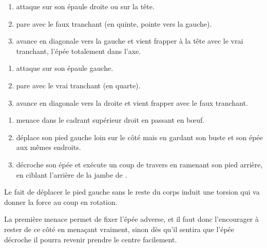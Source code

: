 \begin{technique}

\begin{enumerate}
	\item \A attaque \D sur son épaule droite ou sur la tête.
	
	\item \D pare avec le faux tranchant (en quinte, pointe vers la gauche).
	
	\item \D avance en diagonale vers la gauche et vient frapper \A à la tête avec le vrai tranchant, l'épée totalement dans l'axe.
\end{enumerate}

\end{technique}


\begin{technique}

\begin{enumerate}
	\item \A attaque \D sur son épaule gauche.
	
	\item \D pare avec le vrai tranchant (en quarte).
	
	\item \D avance en diagonale vers la droite et vient frapper \A avec le faux tranchant.
\end{enumerate}

\end{technique}


\begin{technique}

\begin{enumerate}
	\item \A menace \D dans le cadrant supérieur droit en passant en bœuf.
	
	\item \A déplace son pied gauche loin sur le côté mais en gardant son buste et son épée aux mêmes endroits.
	
	\item \A décroche son épée et exécute un coup de travers en ramenant son pied arrière, en ciblant l'arrière de la jambe de \D.
\end{enumerate}

Le fait de déplacer le pied gauche sans le reste du corps induit une torsion qui va donner la force au coup en rotation.

La première menace permet de fixer l'épée adverse, et il faut donc l'encourager à rester de ce côté en menaçant vraiment, sinon dès qu'il sentira que l'épée décroche il pourra revenir prendre le centre facilement.

\end{technique}


